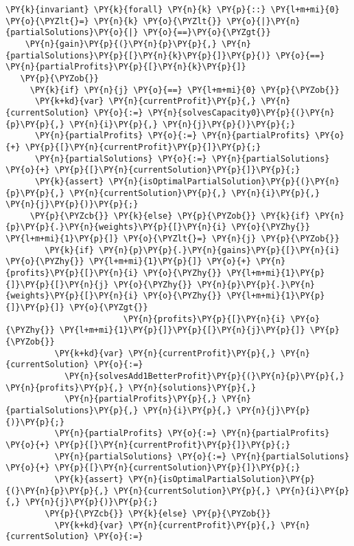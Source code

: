 \begin{sloppypar}
\begin{Verbatim}[commandchars=\\\{\}]
   \PY{k}{invariant} \PY{k}{forall} \PY{n}{k} \PY{p}{::} \PY{l+m+mi}{0} \PY{o}{\PYZlt{}=} \PY{n}{k} \PY{o}{\PYZlt{}} \PY{o}{|}\PY{n}{partialSolutions}\PY{o}{|} \PY{o}{==}\PY{o}{\PYZgt{}} 
    \PY{n}{gain}\PY{p}{(}\PY{n}{p}\PY{p}{,} \PY{n}{partialSolutions}\PY{p}{[}\PY{n}{k}\PY{p}{]}\PY{p}{)} \PY{o}{==} \PY{n}{partialProfits}\PY{p}{[}\PY{n}{k}\PY{p}{]}
   \PY{p}{\PYZob{}}
     \PY{k}{if} \PY{n}{j} \PY{o}{==} \PY{l+m+mi}{0} \PY{p}{\PYZob{}}
      \PY{k+kd}{var} \PY{n}{currentProfit}\PY{p}{,} \PY{n}{currentSolution} \PY{o}{:=} \PY{n}{solvesCapacity0}\PY{p}{(}\PY{n}{p}\PY{p}{,} \PY{n}{i}\PY{p}{,} \PY{n}{j}\PY{p}{)}\PY{p}{;}
      \PY{n}{partialProfits} \PY{o}{:=} \PY{n}{partialProfits} \PY{o}{+} \PY{p}{[}\PY{n}{currentProfit}\PY{p}{]}\PY{p}{;}
      \PY{n}{partialSolutions} \PY{o}{:=} \PY{n}{partialSolutions} \PY{o}{+} \PY{p}{[}\PY{n}{currentSolution}\PY{p}{]}\PY{p}{;}
      \PY{k}{assert} \PY{n}{isOptimalPartialSolution}\PY{p}{(}\PY{n}{p}\PY{p}{,} \PY{n}{currentSolution}\PY{p}{,} \PY{n}{i}\PY{p}{,} \PY{n}{j}\PY{p}{)}\PY{p}{;}
     \PY{p}{\PYZcb{}} \PY{k}{else} \PY{p}{\PYZob{}} \PY{k}{if} \PY{n}{p}\PY{p}{.}\PY{n}{weights}\PY{p}{[}\PY{n}{i} \PY{o}{\PYZhy{}} \PY{l+m+mi}{1}\PY{p}{]} \PY{o}{\PYZlt{}=} \PY{n}{j} \PY{p}{\PYZob{}}
        \PY{k}{if} \PY{n}{p}\PY{p}{.}\PY{n}{gains}\PY{p}{[}\PY{n}{i} \PY{o}{\PYZhy{}} \PY{l+m+mi}{1}\PY{p}{]} \PY{o}{+} \PY{n}{profits}\PY{p}{[}\PY{n}{i} \PY{o}{\PYZhy{}} \PY{l+m+mi}{1}\PY{p}{]}\PY{p}{[}\PY{n}{j} \PY{o}{\PYZhy{}} \PY{n}{p}\PY{p}{.}\PY{n}{weights}\PY{p}{[}\PY{n}{i} \PY{o}{\PYZhy{}} \PY{l+m+mi}{1}\PY{p}{]}\PY{p}{]} \PY{o}{\PYZgt{}} 
                        \PY{n}{profits}\PY{p}{[}\PY{n}{i} \PY{o}{\PYZhy{}} \PY{l+m+mi}{1}\PY{p}{]}\PY{p}{[}\PY{n}{j}\PY{p}{]} \PY{p}{\PYZob{}}
          \PY{k+kd}{var} \PY{n}{currentProfit}\PY{p}{,} \PY{n}{currentSolution} \PY{o}{:=} 
            \PY{n}{solvesAdd1BetterProfit}\PY{p}{(}\PY{n}{p}\PY{p}{,} \PY{n}{profits}\PY{p}{,} \PY{n}{solutions}\PY{p}{,} 
            \PY{n}{partialProfits}\PY{p}{,} \PY{n}{partialSolutions}\PY{p}{,} \PY{n}{i}\PY{p}{,} \PY{n}{j}\PY{p}{)}\PY{p}{;}
          \PY{n}{partialProfits} \PY{o}{:=} \PY{n}{partialProfits} \PY{o}{+} \PY{p}{[}\PY{n}{currentProfit}\PY{p}{]}\PY{p}{;}
          \PY{n}{partialSolutions} \PY{o}{:=} \PY{n}{partialSolutions} \PY{o}{+} \PY{p}{[}\PY{n}{currentSolution}\PY{p}{]}\PY{p}{;}
          \PY{k}{assert} \PY{n}{isOptimalPartialSolution}\PY{p}{(}\PY{n}{p}\PY{p}{,} \PY{n}{currentSolution}\PY{p}{,} \PY{n}{i}\PY{p}{,} \PY{n}{j}\PY{p}{)}\PY{p}{;}
        \PY{p}{\PYZcb{}} \PY{k}{else} \PY{p}{\PYZob{}}
          \PY{k+kd}{var} \PY{n}{currentProfit}\PY{p}{,} \PY{n}{currentSolution} \PY{o}{:=} 

\end{Verbatim}
\end{sloppypar}
